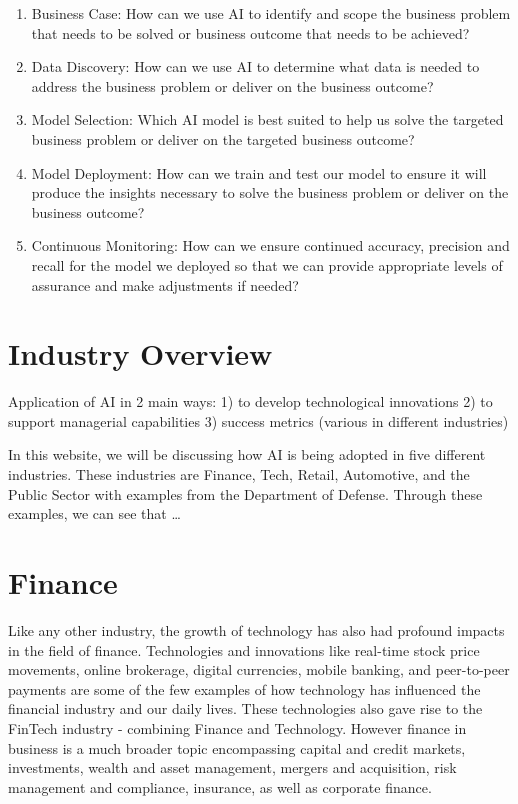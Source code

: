 \documentclass[
]{article}
\providecommand{\tightlist}{%
  \setlength{\itemsep}{0pt}\setlength{\parskip}{0pt}}
\begin{document}
\begin{enumerate}
\def\labelenumi{\arabic{enumi}.}
\tightlist
\item
  Business Case: How can we use AI to identify and scope the business problem that needs to be solved or business outcome that needs to be achieved?
\item
  Data Discovery: How can we use AI to determine what data is needed to address the business problem or deliver on the business outcome?
\item
  Model Selection: Which AI model is best suited to help us solve the targeted business problem or deliver on the targeted business outcome?
\item
  Model Deployment: How can we train and test our model to ensure it will produce the insights necessary to solve the business problem or deliver on the business outcome?
\item
  Continuous Monitoring: How can we ensure continued accuracy, precision and recall for the model we deployed so that we can provide appropriate levels of assurance and make adjustments if needed?
\end{enumerate}

\hypertarget{industry-overview}{%
\section{Industry Overview}\label{industry-overview}}

Application of AI in 2 main ways: 1) to develop technological innovations 2) to support managerial capabilities 3) success metrics (various in different industries)

In this website, we will be discussing how AI is being adopted in five different industries. These industries are Finance, Tech, Retail, Automotive, and the Public Sector with examples from the Department of Defense. Through these examples, we can see that \ldots{}

\hypertarget{finance}{%
\section{Finance}\label{finance}}

Like any other industry, the growth of technology has also had profound impacts in the field of finance. Technologies and innovations like real-time stock price movements, online brokerage, digital currencies, mobile banking, and peer-to-peer payments are some of the few examples of how technology has influenced the financial industry and our daily lives. These technologies also gave rise to the FinTech industry - combining Finance and Technology. However finance in business is a much broader topic encompassing capital and credit markets, investments, wealth and asset management, mergers and acquisition, risk management and compliance, insurance, as well as corporate finance.
\end{document}
